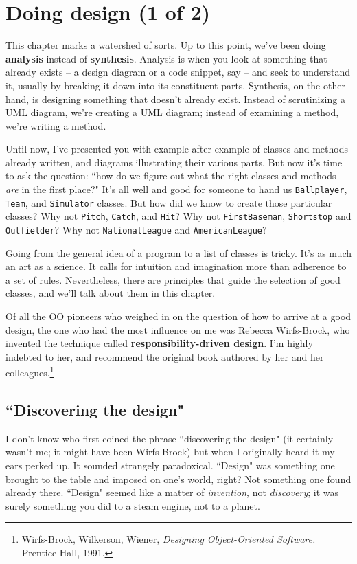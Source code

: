 
\chapter{Doing design (1 of 2)}
\label{design1}

This chapter marks a watershed of sorts. Up to this point, we've been doing
\textbf{analysis} instead of \textbf{synthesis}. Analysis is when you look at
something that already exists -- a design diagram or a code snippet, say --
and seek to understand it, usually by breaking it down into its constituent
parts. Synthesis, on the other hand, is designing something that doesn't
already exist. Instead of scrutinizing a UML diagram, we're creating a UML
diagram; instead of examining a method, we're writing a method.

Until now, I've presented you with example after example of classes and
methods already written, and diagrams illustrating their various parts. But
now it's time to ask the question: ``how do we figure out what the right
classes and methods \textit{are} in the first place?" It's all well and good
for someone to hand us \texttt{Ballplayer}, \texttt{Team}, and
\texttt{Simulator} classes. But how did we know to create those particular
classes? Why not \texttt{Pitch}, \texttt{Catch}, and \texttt{Hit}? Why not
\texttt{FirstBaseman}, \texttt{Shortstop} and \texttt{Outfielder}? Why not
\texttt{NationalLeague} and \texttt{AmericanLeague}?

Going from the general idea of a program to a list of classes is tricky. It's
as much an art as a science. It calls for intuition and imagination more than
adherence to a set of rules. Nevertheless, there are principles that guide the
selection of good classes, and we'll talk about them in this chapter.

Of all the OO pioneers who weighed in on the question of how to arrive at a
good design, the one who had the most influence on me was Rebecca Wirfs-Brock,
who invented the technique called \textbf{responsibility-driven design}. I'm
highly indebted to her, and recommend the original book authored by her and
her colleagues.\footnote{Wirfs-Brock, Wilkerson, Wiener, \textit{Designing
Object-Oriented Software.} Prentice Hall, 1991.}

\section{``Discovering the design"}

I don't know who first coined the phrase ``discovering the design" (it
certainly wasn't me; it might have been Wirfs-Brock) but when I originally
heard it my ears perked up. It sounded strangely paradoxical. ``Design" was
something one brought to the table and imposed on one's world, right? Not
something one found already there. ``Design" seemed like a matter of
\textit{invention}, not \textit{discovery}; it was surely something you did to
a steam engine, not to a planet.


